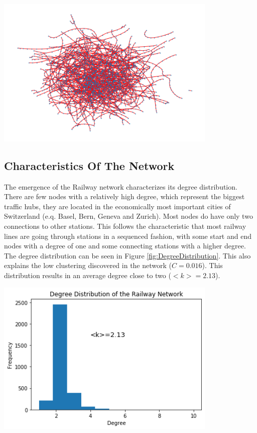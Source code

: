 \documentclass{Resources/netsci-project}
\begin{document}
\begin{center}
    \centering
    \includegraphics[width=300pt]{Resources/Network_cleaned_on_map}
    \label{fig:NetworkCleanedOnMap}
\end{center}


\subsection{Characteristics Of The Network}
The emergence of the Railway network characterizes its degree distribution. There are few nodes with a relatively high degree, which represent the biggest traffic hubs, they are located in the economically most important cities of Switzerland (e.q. Basel, Bern, Geneva and Zurich). Most nodes do have only two connections to other stations. This follows the characteristic that most railway lines are going through stations in a sequenced fashion, with some start and end nodes with a degree of one and some connecting stations with a higher degree. The degree distribution can be seen in Figure \ref{fig:DegreeDistribution}. This also explains the low clustering discovered in the network ($ C = 0.016 $). This distribution results in an average degree close to two ($ <k> = 2.13 $).

\begin{center}
    \centering
    \includegraphics[width=300pt]{Resources/degree_distribution}
    \label{fig:DegreeDistribution}
\end{center}
\end{document}

